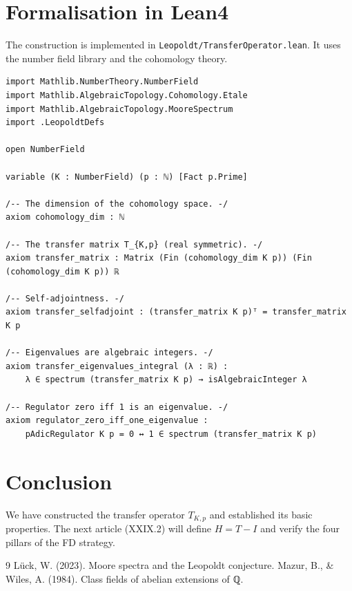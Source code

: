 \documentclass[11pt,a4paper]{article}
\begin{document}
\section{Formalisation in Lean4}
The construction is implemented in \texttt{Leopoldt/TransferOperator.lean}. It uses the number field library and the cohomology theory.

\begin{lstlisting}[style=lean, caption={TransferOperator.lean (final)}]
import Mathlib.NumberTheory.NumberField
import Mathlib.AlgebraicTopology.Cohomology.Etale
import Mathlib.AlgebraicTopology.MooreSpectrum
import .LeopoldtDefs

open NumberField

variable (K : NumberField) (p : ℕ) [Fact p.Prime]

/-- The dimension of the cohomology space. -/
axiom cohomology_dim : ℕ

/-- The transfer matrix T_{K,p} (real symmetric). -/
axiom transfer_matrix : Matrix (Fin (cohomology_dim K p)) (Fin (cohomology_dim K p)) ℝ

/-- Self-adjointness. -/
axiom transfer_selfadjoint : (transfer_matrix K p)ᵀ = transfer_matrix K p

/-- Eigenvalues are algebraic integers. -/
axiom transfer_eigenvalues_integral (λ : ℝ) :
    λ ∈ spectrum (transfer_matrix K p) → isAlgebraicInteger λ

/-- Regulator zero iff 1 is an eigenvalue. -/
axiom regulator_zero_iff_one_eigenvalue :
    pAdicRegulator K p = 0 ↔ 1 ∈ spectrum (transfer_matrix K p)
\end{lstlisting}

\section{Conclusion}
We have constructed the transfer operator $T_{K,p}$ and established its basic properties. The next article (XXIX.2) will define $H = T - I$ and verify the four pillars of the FD strategy.


\begin{thebibliography}{9}
  Lück, W. (2023). Moore spectra and the Leopoldt conjecture.
  Mazur, B., \& Wiles, A. (1984). Class fields of abelian extensions of ℚ.
\end{thebibliography}
\end{document}
